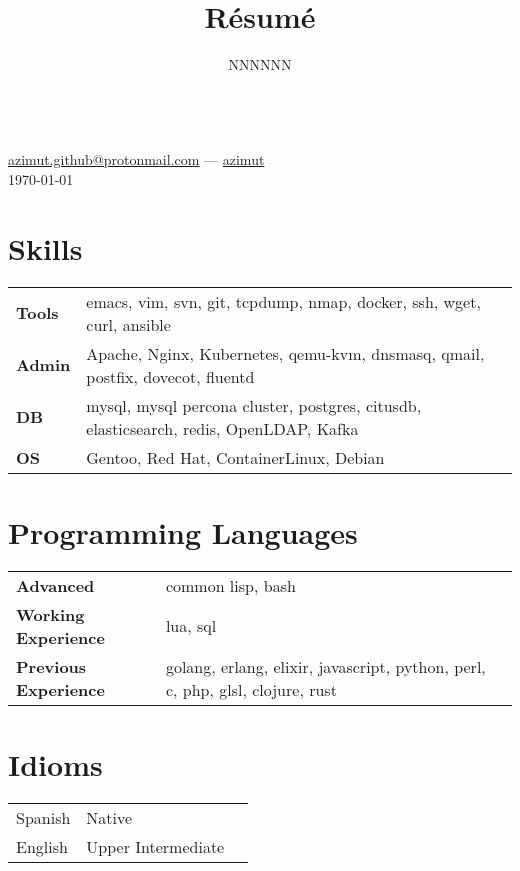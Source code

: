 \documentclass[11pt]{article}
\makeatletter
\renewcommand{\maketitle}{
  \begin{center}{\huge\bfseries\theauthor} \\
    \vspace{.25em}
    {\faEnvelope} \href {mailto:azimut.github@protonmail.com} {azimut.github@protonmail.com}
    ---
    {\faGithub} \href {https://github.com/azimut} {azimut} \\
    \vspace{.25em}
    \today
  \end{center}
}
\makeatother
\begin{document}
\title{R\'esum\'e}
\author{NNNNNN}
\maketitle


\section{Skills}


\begin{tabular}{@{}lll@{}}
  \hspace{.1em} \textbf{Tools} & emacs, vim, svn, git, tcpdump, nmap, docker, ssh, wget, curl, ansible \\
  \hspace{.1em} \textbf{Admin} & Apache, Nginx, Kubernetes, qemu-kvm, dnsmasq, qmail, postfix, dovecot, fluentd \\
  \hspace{.1em} \textbf{DB}    & mysql, mysql percona cluster, postgres, citusdb, elasticsearch, redis, OpenLDAP, Kafka \\
  \hspace{.1em} \textbf{OS}    & Gentoo, Red Hat, ContainerLinux, Debian \\
\end{tabular}


\section{Programming Languages}


\begin{tabular}{@{}lll@{}}
  \hspace{.1em} \textbf{Advanced}            & common lisp, bash \\
  \hspace{.1em} \textbf{Working Experience}  & lua, sql \\
  \hspace{.1em} \textbf{Previous Experience} & golang, erlang, elixir, javascript, python, perl, c, php, glsl, clojure, rust \\
\end{tabular}


\section{Idioms}


\begin{tabular}{@{}lll@{}}
  \hspace{.1em} Spanish & Native \\
  \hspace{.1em} English & Upper Intermediate
  \\
\end{tabular}
\end{document}
